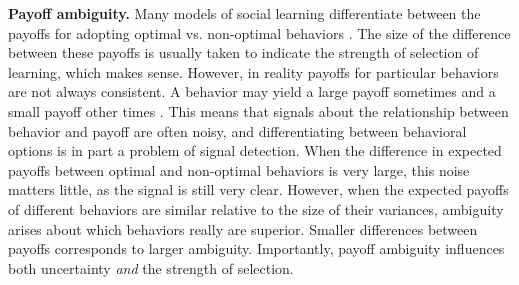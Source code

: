 \documentclass[letterpaper,11.5pt]{scrartcl}
\begin{document}
\textbf{Payoff ambiguity.}
Many models of social learning differentiate between the payoffs for adopting optimal vs. non-optimal behaviors \cite{Rogers1988,Enquist2007,Rendell2010}. The size of the difference between these payoffs is usually taken to indicate the strength of selection of learning, which makes sense. However, in reality payoffs for particular behaviors are not always consistent. A behavior may yield a large payoff sometimes and a small payoff other times \cite{McElreath2005}. This means that signals about the relationship between behavior and payoff are often noisy, and differentiating between behavioral options is in part a problem of signal detection.
When the difference in expected payoffs between optimal and non-optimal behaviors is very large, this noise matters little, as the signal is still very clear. However, when the expected payoffs of different behaviors are similar relative to the size of their variances, ambiguity arises about which behaviors really are superior. Smaller differences between payoffs corresponds to larger ambiguity.    
Importantly, payoff ambiguity %
influences both uncertainty \emph{and} the strength of selection. %
\end{document}

